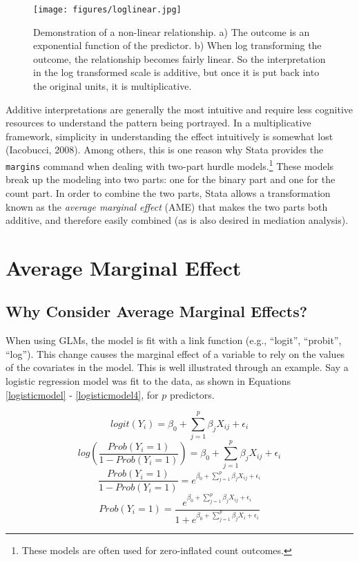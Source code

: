 \documentclass[]{DissertateUSU}
\let\rmarkdownfootnote\footnote%
\def\footnote{\protect\rmarkdownfootnote}
\begin{document}
\begin{figure}[tb]
  \centering
  \texttt{[image: figures/loglinear.jpg]}
  \caption{Demonstration of a non-linear relationship. a) The outcome is an exponential function of the predictor. b) When log transforming the outcome, the relationship becomes fairly linear. So the interpretation in the log transformed scale is additive, but once it is put back into the original units, it is multiplicative.}
  \label{fig:loglinear}
\end{figure}

Additive interpretations are generally the most intuitive and require
less cognitive resources to understand the pattern being portrayed. In a
multiplicative framework, simplicity in understanding the effect
intuitively is somewhat lost (Iacobucci, 2008). Among others, this is
one reason why Stata provides the \texttt{margins} command when dealing
with two-part hurdle
models.\footnote{These models are often used for zero-inflated count outcomes.}
These models break up the modeling into two parts: one for the binary
part and one for the count part. In order to combine the two parts,
Stata allows a transformation known as the \emph{average marginal
effect} (AME) that makes the two parts both additive, and therefore
easily combined (as is also desired in mediation analysis).

\section{Average Marginal Effect}\label{average-marginal-effect}

\subsection{Why Consider Average Marginal
Effects?}\label{why-consider-average-marginal-effects}

When using GLMs, the model is fit with a link function (e.g., ``logit'',
``probit'', ``log''). This change causes the marginal effect of a
variable to rely on the values of the covariates in the model. This is
well illustrated through an example. Say a logistic regression model was
fit to the data, as shown in Equations \ref{logisticmodel} -
\ref{logisticmodel4}, for \(p\) predictors.

\begin{equation}\label{logisticmodel}
logit(Y_i) = \beta_0 + \sum_{j=1}^p \beta_{j} X_{ij} + \epsilon_i
\end{equation}\begin{equation}\label{logisticmodel2}
log(\frac{Prob(Y_i = 1)}{1 - Prob(Y_i = 1)}) = \beta_0 + \sum_{j=1}^p \beta_{j} X_{ij} + \epsilon_i
\end{equation}\begin{equation}\label{logisticmodel3}
\frac{Prob(Y_i = 1)}{1 - Prob(Y_i = 1)} = e^{\beta_0 + \sum_{j=1}^p \beta_{j} X_{ij} + \epsilon_i}
\end{equation}\begin{equation}\label{logisticmodel4}
Prob(Y_i = 1) = \frac{e^{\beta_0 + \sum_{j=1}^p \beta_{j} X_{ij} + \epsilon_i}}{1 + e^{\beta_0 + \sum_{j=1}^p \beta_{j} X_i + \epsilon_i}}
\end{equation}
\end{document}
